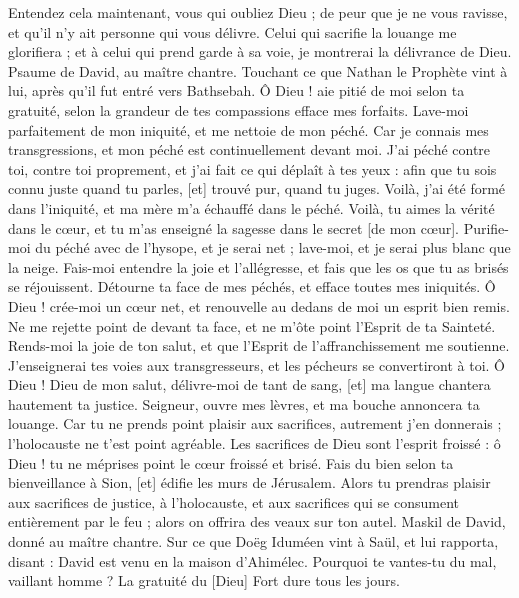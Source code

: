\begin{multicols}{2}
Entendez cela maintenant, vous qui oubliez Dieu ; de peur que je ne vous ravisse, et qu'il n'y ait personne qui vous délivre.
Celui qui sacrifie la louange me glorifiera ; et à celui qui prend garde à sa voie, je montrerai la délivrance de Dieu.
\VerseOne{}Psaume de David, au maître chantre. Touchant ce que Nathan le Prophète vint à lui, après qu'il fut entré vers Bathsebah. Ô Dieu ! aie pitié de moi selon ta gratuité, selon la grandeur de tes compassions efface mes forfaits.
Lave-moi parfaitement de mon iniquité, et me nettoie de mon péché.
Car je connais mes transgressions, et mon péché est continuellement devant moi.
J'ai péché contre toi, contre toi proprement, et j'ai fait ce qui déplaît à tes yeux : afin que tu sois connu juste quand tu parles, [et] trouvé pur, quand tu juges.
Voilà, j'ai été formé dans l'iniquité, et ma mère m'a échauffé dans le péché.
Voilà, tu aimes la vérité dans le cœur, et tu m'as enseigné la sagesse dans le secret [de mon cœur].
Purifie-moi du péché avec de l'hysope, et je serai net ; lave-moi, et je serai plus blanc que la neige.
Fais-moi entendre la joie et l'allégresse, et fais que les os que tu as brisés se réjouissent.
Détourne ta face de mes péchés, et efface toutes mes iniquités.
Ô Dieu ! crée-moi un cœur net, et renouvelle au dedans de moi un esprit bien remis.
Ne me rejette point de devant ta face, et ne m'ôte point l'Esprit de ta Sainteté.
Rends-moi la joie de ton salut, et que l'Esprit de l'affranchissement me soutienne.
J'enseignerai tes voies aux transgresseurs, et les pécheurs se convertiront à toi.
Ô Dieu ! Dieu de mon salut, délivre-moi de tant de sang, [et] ma langue chantera hautement ta justice.
Seigneur, ouvre mes lèvres, et ma bouche annoncera ta louange.
Car tu ne prends point plaisir aux sacrifices, autrement j'en donnerais ; l'holocauste ne t'est point agréable.
Les sacrifices de Dieu sont l'esprit froissé : ô Dieu ! tu ne méprises point le cœur froissé et brisé.
Fais du bien selon ta bienveillance à Sion, [et] édifie les murs de Jérusalem.
Alors tu prendras plaisir aux sacrifices de justice, à l'holocauste, et aux sacrifices qui se consument entièrement par le feu ; alors on offrira des veaux sur ton autel.
\VerseOne{}Maskil de David, donné au maître chantre. Sur ce que Doëg Iduméen vint à Saül, et lui rapporta, disant : David est venu en la maison d'Ahimélec. Pourquoi te vantes-tu du mal, vaillant homme ? La gratuité du [Dieu] Fort dure tous les jours.

\end{multicols}
